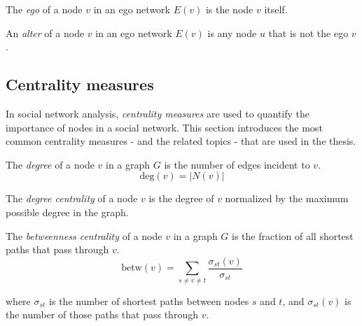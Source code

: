 \begin{definition}
    The \textit{ego} of a node $v$ in an ego network $E(v)$ is the node $v$ itself.
\end{definition}

\begin{definition}
    An \textit{alter} of a node $v$ in an ego network $E(v)$ is any node $u$ that is not the ego $v$.
\end{definition}

\subsection{Centrality measures}

In social network analysis, \textit{centrality measures} are used to quantify the importance of nodes in a social network.
This section introduces the most common centrality measures - and the related topics - that are used in the thesis.

\begin{definition}
    \label{def:node-degree}
    The \textit{degree} of a node $v$ in a graph $G$ is the number of edges incident to $v$.
    $$
    \text{deg}(v) = |N(v)|
    $$

    The \textit{degree centrality} of a node $v$ is the degree of $v$ normalized by the maximum possible degree in the graph.
\end{definition}

\begin{definition}
    The \textit{betweenness centrality} of a node $v$ in a graph $G$ is the fraction of all shortest paths that pass through $v$.
    $$
    \text{betw}(v) = \sum_{s \neq v \neq t} \frac{\sigma_{st}(v)}{\sigma_{st}}
    $$

    where $\sigma_{st}$ is the number of shortest paths between nodes $s$ and $t$, and $\sigma_{st}(v)$ is the number of those paths that pass through $v$.
\end{definition}


